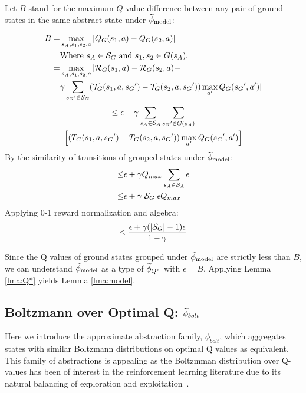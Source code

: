 Let $B$ stand for the maximum $Q$-value difference between any pair of ground states in the same abstract state under $\widetilde \phi_{\text{model}}$:

\begin{align*}
B = &\max_{s_A, s_1, s_2, a}  |Q_G(s_1, a) - Q_G(s_2, a)|\\
&\text{Where $s_A \in \mathcal{S}_G$ and $s_1, s_2 \in G(s_A)$.}\\
=&\max_{s_A, s_1, s_2, a}      |\mathcal{R}_G(s_1, a) - \mathcal{R}_G(s_2, a) +\\
& \gamma \sum_{{s_G}' \in \mathcal{S}_G}(\mathcal{T}_G(s_1,a,{s_G}')-\mathcal{T}_G(s_2, a, {s_G}'))\max_{a'}Q_G({s_G}', a')|
\end{align*}
\begin{multline*}
\leq \epsilon + \gamma \sum_{s_A \in \mathcal{S}_A}\sum_{{s_G}' \in G(s_A)} \\ \left[(T_G(s_1, a, {s_G}')-T_G(s_2, a, {s_G}')) 		\max_{a'}Q_G({s_G}', a')	\right]
\end{multline*}
By the similarity of transitions of grouped states under $\widetilde \phi_{\text{model}}$:
\begin{align*}
 \leq &\epsilon + \gamma Q_{max} \sum_{s_A \in \mathcal{S}_A} \epsilon \\
\leq& \epsilon + \gamma|\mathcal{S}_G|\epsilon Q_{max}
\end{align*}
Applying 0-1 reward normalization and algebra:
\begin{equation*}
 \leq \frac{\epsilon + \gamma(|\mathcal{S}_G| - 1) \epsilon}{1-\gamma}
\end{equation*}


Since the Q values of ground states grouped under $\widetilde \phi_{\text{model}}$ are strictly less than $B$, we can understand $\widetilde \phi_{\text{model}}$ as a type of $\widetilde \phi_{Q^*}$ with $\epsilon = B$. Applying Lemma \ref{lma:Q*} yields Lemma \ref{lma:model}.


\subsection{Boltzmann over Optimal Q: $\widetilde \phi_{bolt}$}
\label{sec:boltz}

Here we introduce the approximate abstraction family, $\phi_{bolt}$, which aggregates states with similar Boltzmann distributions on optimal Q values as equivalent. This family of abstractions is appealing as the Boltzmman distribution over Q-values has been of interest in the reinforcement learning literature due to its natural balancing of exploration and exploitation~\cite{sutton1998reinforcement}.


